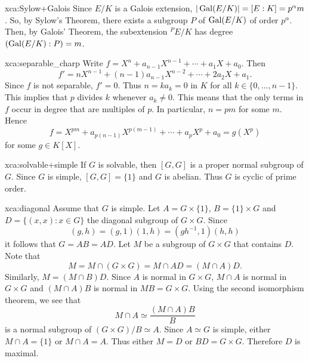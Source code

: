  \begin{sol}{xca:Sylow+Galois}
     Since $E/K$ is a Galois extension,
     $|\operatorname{Gal}(E/K)|=[E:K]=p^\alpha m$.
     So, by Sylow's Theorem, there exists a subgroup $P$ 
     of $\operatorname{Gal}(E/K)$
     of order $p^{\alpha}$.
     Then, by Galois' Theorem, the subextension
     ${}^PE/K$
     has degree $(\operatorname{Gal}(E/K):P)=m$.
 \end{sol}

\begin{sol}{xca:separable_charp}
    Write $f=X^n+a_{n-1}X^{n-1}+\cdots+a_1X+a_0$. Then 
    \[ 
    f'=nX^{n-1}+(n-1)a_{n-1}X^{n-2}+\cdots+2a_2X+a_1.
    \]
    Since $f$ is not separable, $f'=0$. Thus $n=ka_k=0$ in $K$ for all $k\in\{0,\dots,n-1\}$. This implies
    that $p$ divides $k$ whenever $a_k\ne 0$. This means that the only terms in $f$ occur in degree 
    that are multiples of $p$. In particular, $n=pm$ for some $m$. Hence 
    \[
    f=X^{pm}+a_{p(n-1)}X^{p(m-1)}+\cdots+a_pX^p+a_0=g(X^p)
    \]
    for some $g\in K[X]$.  
\end{sol}


\begin{sol}{xca:solvable+simple}
 If $G$ is solvable, then $[G,G]$ is a proper normal subgroup of $G$. 
 Since $G$ is simple, $[G,G]=\{1\}$ and $G$ is abelian. Thus $G$ is cyclic of prime order.
\end{sol}

\begin{sol}{xca:diagonal}
 Assume that $G$ is simple. Let $A=G\times\{1\}$, $B=\{1\}\times G$ and
 $D=\{(x,x):x\in G\}$ the diagonal subgroup of $G\times G$. 
 Since 
 \[
 (g,h)=(g,1)(1,h)=(gh^{-1},1)(h,h)
 \]
 it follows that $G=AB=AD$. Let $M$ be a subgroup of $G\times G$ that contains $D$. 
 Note that
 \[
 M=M\cap (G\times G)=M\cap AD=(M\cap A)D. 
 \]
 Similarly, $M=(M\cap B)D$. Since $A$ is normal in $G\times G$, $M\cap A$ is normal in $G\times G$ 
 and $(M\cap A)B$ is normal in $MB=G\times G$. Using the second isomorphism theorem, we see that
 \[
 M\cap A\simeq \frac{(M\cap A)B}{B}
 \]
 is a normal subgroup of $(G\times G)/B\simeq A$. Since $A\simeq G$ is simple, either 
 $M\cap A=\{1\}$ or $M\cap A=A$. Thus either $M=D$ or $BD=G\times G$. Therefore $D$ is maximal.
 \end{sol}
